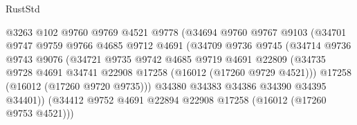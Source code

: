 \begin{lexlean}{RustStd}
\begin{coremodule}
                                    @3263
                                    @102
                                    @9760
                                    @9769
                                    @4521
                                    @9778
                                    (@34694
                                      @9760
                                      @9767
                                      @9103
                                      (@34701
                                        @9747
                                        @9759
                                        @9766
                                        @4685
                                        @9712
                                        @4691
                                        (@34709
                                          @9736
                                          @9745
                                          (@34714
                                            @9736
                                            @9743
                                            @9076
                                            (@34721
                                              @9735
                                              @9742
                                              @4685
                                              @9719
                                              @4691
                                              @22809
                                              (@34735
                                                @9728
                                                @4691
                                                @34741
                                                @22908
                                                @17258
                                                (@16012 (@17260 @9729 @4521)))
                                              @17258
                                              (@16012 (@17260 @9720 @9735)))
                                            @34380
                                            @34383
                                            @34386
                                            @34390
                                            @34395
                                            @34401))
                                        (@34412
                                          @9752
                                          @4691
                                          @22894
                                          @22908
                                          @17258
                                          (@16012 (@17260 @9753 @4521)))

\end{coremodule}
\end{lexlean}
